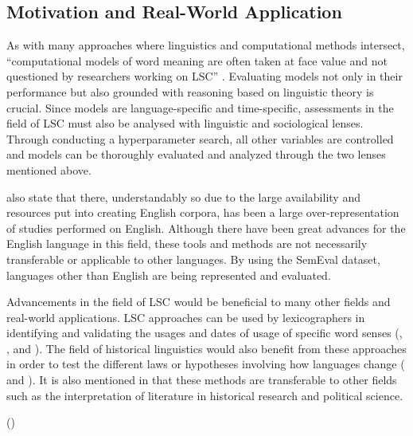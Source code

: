 \subsection{Motivation and Real-World Application}

As with many approaches where linguistics and computational methods intersect, “computational models of word meaning are often taken at face value and not questioned by researchers working on LSC” \citep{hengchen2021challenges}. Evaluating models not only in their performance but also grounded with reasoning based on linguistic theory is crucial. Since models are language-specific and time-specific, assessments in the field of LSC must also be analysed with linguistic and sociological lenses. Through conducting a hyperparameter search, all other variables are controlled and models can be thoroughly evaluated and analyzed through the two lenses mentioned above. 

\citet{hengchen2021challenges} also state that there, understandably so due to the large availability and resources put into creating English corpora, has been a large over-representation of studies performed on English. Although there have been great advances for the English language in this field, these tools and methods are not necessarily transferable or applicable to other languages. By using the SemEval dataset, languages other than English are being represented and evaluated. 

Advancements in the field of LSC would be beneficial to many other fields and real-world applications. LSC approaches can be used by lexicographers in identifying and validating the usages and dates of usage of specific word senses (\citet{lau-etal-2012-word}, \citet{falk-etal-2014-non}, and \citet{klosa-2018-newgerman}). The field of historical linguistics would also benefit from these approaches in order to test the different laws or hypotheses involving how languages change (\citet{hamilton-etal-2016-diachronic} and \citet{Xu2015ACE}). It is also mentioned in \citet{hengchen2021challenges} that these methods are transferable to other fields such as the interpretation of literature in historical research and political science.  

(\citet{lau-etal-2012-word,falk-etal-2014-non,klosa-2018-newgerman})\\
\citep{lau-etal-2012-word,falk-etal-2014-non,klosa-2018-newgerman}

